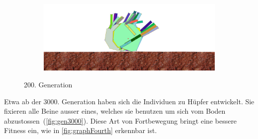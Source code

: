 \begin{figure}[H]
\begin{subfigure}[b]{0.45\textwidth}
              \caption{\label{fig:gen200_3}}
            \end{subfigure}
            \begin{subfigure}[b]{0.45\textwidth}
              \includegraphics[width=\linewidth,center]{graphics/simulation-results/4_gen200_4}
              \caption{\label{fig:gen200_4}}
            \end{subfigure}
            \caption{200. Generation \label{fig:gen200}}
          \end{figure}

          Etwa ab der 3000. Generation haben sich die Individuen zu Hüpfer entwickelt.
          Sie fixieren alle Beine ausser eines, welches sie benutzen um sich vom Boden abzustossen~(\vref{fig:gen3000}).
          Diese Art von Fortbewegung bringt eine bessere Fitness ein, wie in \vref{fig:graphFourth} erkennbar ist.

